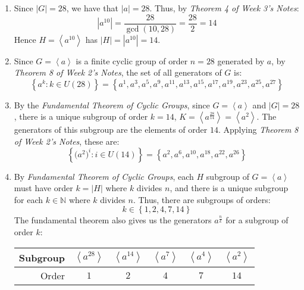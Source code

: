 \documentclass[a4paper, 11pt]{article}
\newcommand{\NN}{\mathbb{N}}
\def\set#1{\left\{ #1 \right\}}
\def\gen#1{\left\langle#1 \right\rangle}
\begin{document}
\begin{enumerate}[label=(\alph*)]
	\item Since $|G|=28$, we have that $|a|=28$. Thus, by \textit{Theorem 4 of Week 3's Notes}: 
	$$|a^{10}|=\frac{28}{\gcd(10,28)}=\frac{28}{2}=14$$
	Hence $H=\gen{a^{10}}$ has $|H|=|a^{10}|=14$. 

	\item Since $G=\gen{a}$ is a finite cyclic group of order $n=28$ generated by $a$, by \textit{Theorem 8 of Week 2's Notes}, the set of all generators of $G$ is:
	\[
		\set{a^k:k\in U(28)}=\set{
			a^{1},
			a^{3},
			a^{5},
			a^{9},
			a^{11},
			a^{13},
			a^{15},
			a^{17},
			a^{19},
			a^{23},
			a^{25},
			a^{27}
		}
	\]

	\item By the \textit{Fundamental Theorem of Cyclic Groups}, since $G=\gen{a}$ and $|G|=28$, there is a unique subgroup of order $k=14$, $K=\gen{a^{\frac{28}{14}}}=\gen{a^2}$. The generators of this subgroup are the elements of order $14$. Applying \textit{Theorem 8 of Week 2's Notes}, these are: 
	\[
		\set{\big(a^2\big)^i : i \in U(14)}
		=\set{
			a^{2}, a^{6}, a^{10}, a^{18}, a^{22}, a^{26}
		}
	\]
	
	\item By \textit{Fundamental Theorem of Cyclic Groups}, each $H$ subgroup of $G=\gen{a}$ must have order $k=|H|$ where $k$ divides $n$, and there is a unique subgroup for each $k\in\NN$ where $k$ divides $n$. Thus, there are subgroups of orders: 
	\[
		k\in\set{1,2,4,7,14}	
	\]
	The fundamental theorem also gives us the generators $a^{\frac nk}$ for a subgroup of order $k$: 

	\begin{center}
		\begin{tabular}{r|ccccc}
			Subgroup& 
			$\gen{a^{28}}$&
			$\gen{a^{14}}$&
			$\gen{a^{7}}$&
			$\gen{a^{4}}$&
			$\gen{a^{2}}$ \\ 
			\midrule
			Order&
			$1$&
			$2$&
			$4$&
			$7$&
			$14$
		\end{tabular}
	\end{center}
\end{enumerate}
\end{document}
